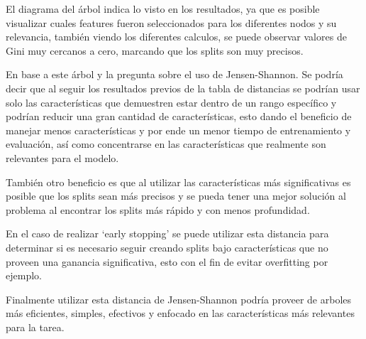 \documentclass[12pt,a4paper]{article}
\begin{document}
El diagrama del árbol indica lo visto en los resultados, ya que es posible visualizar cuales features fueron
seleccionados para los diferentes nodos y su relevancia, también viendo los diferentes calculos, se puede observar
valores de Gini muy cercanos a cero, marcando que los splits son muy precisos.

En base a este árbol y la pregunta sobre el uso de Jensen-Shannon.
Se podría decir que al seguir los resultados previos de la tabla de distancias se podrían usar solo las
características que demuestren estar dentro de un rango específico y podrían reducir una gran cantidad de características,
esto dando el beneficio de manejar menos características y por ende un menor tiempo de entrenamiento y evaluación, así como
concentrarse en las características que realmente son relevantes para el modelo.

También otro beneficio es que al utilizar las características más significativas es posible que los splits sean más precisos
y se pueda tener una mejor solución al problema al encontrar los splits más rápido y con menos profundidad.

En el caso de realizar `early stopping' se puede utilizar esta distancia para determinar si es necesario seguir creando splits bajo características
que no proveen una ganancia significativa, esto con el fin de evitar overfitting por ejemplo.

Finalmente utilizar esta distancia de Jensen-Shannon podría proveer de arboles más eficientes, simples, efectivos y enfocado
en las características más relevantes para la tarea.
\end{document}
